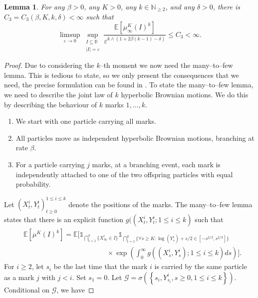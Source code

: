 \documentclass{article}
\newtheorem{lem}[thm]{Lemma}
\theoremstyle{definition}
\numberwithin{equation}{section}
\numberwithin{thm}{section}
\newcommand*{\eps}{\ensuremath{\varepsilon}}            %
\newcommand*{\RR}{\ensuremath{\mathbb{R}}}	        	%
\newcommand*{\NN}{\ensuremath{\mathbb{N}}}		        %
\newcommand*{\EE}{\ensuremath{\mathbb{E}}}	        	%
\newcommand*{\II}{\ensuremath{\mathds{1}}}	        	%
\begin{document}
\begin{lem}\label{lemma:k_th_moment}
    For any $\beta>0$, any $K>0$, any $k\in \NN_{\geq 2}$, and any $\delta>0$, there is $C_3 =C_3(\beta, K, k, \delta)< \infty$ such that
    \begin{equation*}
        \limsup_{\eps \to 0} \sup_{\substack{I\subseteq \RR \\ \vert I \vert =\eps}} \frac{\EE\left[ \mu^K_\infty(I)^k\right]}{\eps^{k \wedge(1+2\beta (k-1)-\delta)}} \leq C_3<\infty.
    \end{equation*}
\end{lem}

\begin{proof}
    Due to considering the $k$--th moment we now need the many--to--few lemma. This is tedious to state, so
    {we only present the consequences that we need, the precise formulation can be found in \cite{harris_many--few_2017}.}
    To state the many--to--few lemma, we need to describe the joint law of $k$ hyperbolic Brownian motions. We do this by describing the behaviour of $k$ marks $1,\ldots,k$.
    \begin{enumerate}
        \item We start with one particle carrying all marks. 
        \item All particles move as independent hyperbolic Brownian motions, branching at rate $\beta$. 
        \item For a particle carrying $j$ marks, at a branching event, each mark is independently attached to one of the two offspring particles with equal probability. 
    \end{enumerate}
    Let $(X^i_t,Y^i_t)_{t\geq 0}^{1\leq i \leq k}$ denote the positions of the marks. The many--to--few lemma states that there is an explicit function $g((X^i_t,Y^i_t;1\leq i\leq k)$ such that
    \begin{align}\label{eq:crude_many_to_k}
        &\EE\left[\mu^K(I)^k\right]=\EE\bigg[\II_{ \bigcap_{i=1}^k \{X_\infty^i\in I\}} \II_{\bigcap_{i=1}^k\{\forall s\geq K: \log(Y_s^i)+s/2\in [-s^{2/3},s^{2/3}]\}} \nonumber \\ &\hspace{5cm} \times \exp\left( \int_0^\infty g((X^i_s,Y^i_s);1\leq i\leq k)ds\right)\bigg].
    \end{align}
    For $i\geq 2$, let $s_i$ be the last time that the mark $i$ is carried by the same particle as a mark $j$ with $j<i$. Set $s_1=0$.
    {Let} $\mathcal{G}=\sigma\left(\left\{s_i,Y_{s_i}^i,s\geq0,1\leq i \leq k\right\}\right)$. Conditional on $\mathcal{G}$, we have 

\end{proof}
\end{document}
